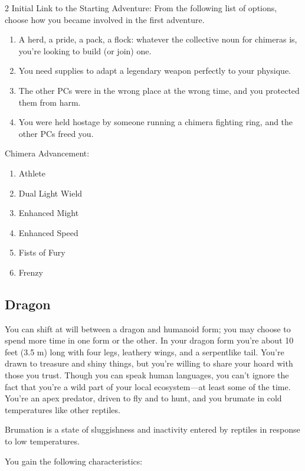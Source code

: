 \begin{multicols}{2}
Initial Link to the Starting Adventure: From the following list of options, choose how you became involved in the first adventure.
\begin{enumerate}
\item A herd, a pride, a pack, a flock: whatever the collective noun for chimeras is, you’re looking to build (or join) one.
\item You need supplies to adapt a legendary weapon perfectly to your physique.
\item The other PCs were in the wrong place at the wrong time, and you protected them from harm.
\item You were held hostage by someone running a chimera fighting ring, and the other PCs freed you.
\end{enumerate}

Chimera Advancement:

\begin{enumerate}
\item Athlete 
\item Dual Light Wield
\item Enhanced Might
\item Enhanced Speed
\item Fists of Fury 
\item Frenzy
\end{enumerate}

\subsection{Dragon}

You can shift at will between a dragon and humanoid form; you may choose to spend more time in one form or the other. In your dragon form you’re about 10 feet (3.5 m) long with four legs, leathery wings, and a serpentlike tail. You’re drawn to treasure and shiny things, but you’re willing to share your hoard with those you trust. Though you can speak human languages, you can’t ignore the fact that you’re a wild part of your local ecosystem—at least some of the time. You’re an apex predator, driven to fly and to hunt, and you brumate in cold temperatures like other reptiles.
 
Brumation is a state of sluggishness and inactivity entered by reptiles in response to low temperatures.

You gain the following characteristics:


\end{multicols}
